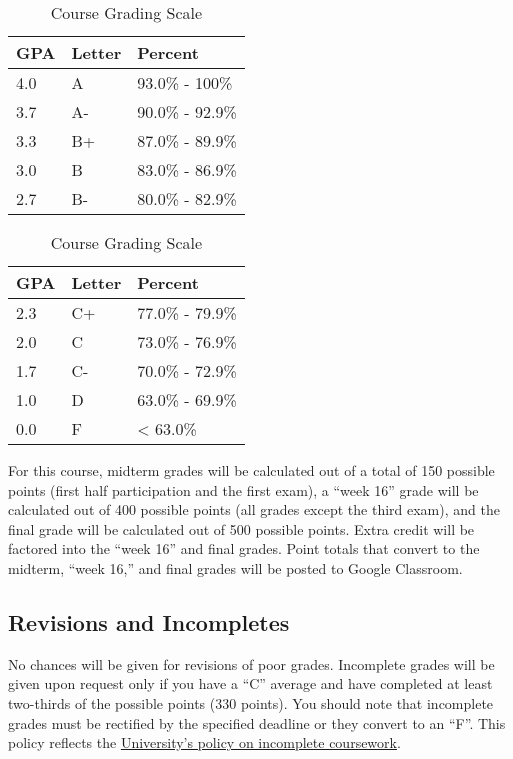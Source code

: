 \documentclass[]{book}
\begin{document}
\begin{table}
\caption{\label{tab:unnamed-chunk-7}Course Grading Scale}

\centering
\begin{tabular}[t]{lll}
\toprule
GPA & Letter & Percent\\
\midrule
4.0 & A & 93.0\% - 100\%\\
3.7 & A- & 90.0\% - 92.9\%\\
3.3 & B+ & 87.0\% - 89.9\%\\
3.0 & B & 83.0\% - 86.9\%\\
2.7 & B- & 80.0\% - 82.9\%\\
\bottomrule
\end{tabular}
\centering
\begin{tabular}[t]{lll}
\toprule
GPA & Letter & Percent\\
\midrule
2.3 & C+ & 77.0\% - 79.9\%\\
2.0 & C & 73.0\% - 76.9\%\\
1.7 & C- & 70.0\% - 72.9\%\\
1.0 & D & 63.0\% - 69.9\%\\
0.0 & F & < 63.0\%\\
\bottomrule
\end{tabular}
\end{table}

For this course, midterm grades will be calculated out of a total of 150 possible points (first half participation and the first exam), a ``week 16'' grade will be calculated out of 400 possible points (all grades except the third exam), and the final grade will be calculated out of 500 possible points. Extra credit will be factored into the ``week 16'' and final grades. Point totals that convert to the midterm, ``week 16,'' and final grades will be posted to Google Classroom.

\hypertarget{revisions-and-incompletes}{%
\subsection{Revisions and Incompletes}\label{revisions-and-incompletes}}

No chances will be given for revisions of poor grades. Incomplete grades will be given upon request only if you have a ``C'' average and have completed at least two-thirds of the possible points (330 points). You should note that incomplete grades must be rectified by the specified deadline or they convert to an ``F''. This policy reflects the \href{https://catalog.slu.edu/academic-policies/academic-policies-procedures/incomplete-course/}{University's policy on incomplete coursework}.
\end{document}
